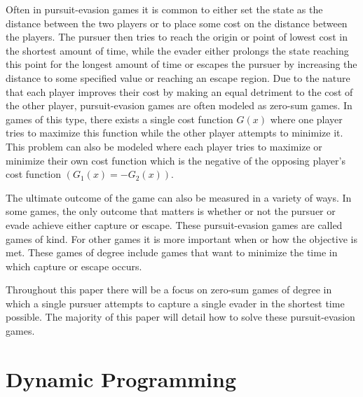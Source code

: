 Often in pursuit-evasion games it is common to either set the state as the distance between the two players or to place some cost on the distance between the players. The pursuer then tries to reach the origin or point of lowest cost in the shortest amount of time, while the evader either prolongs the state reaching this point for the longest amount of time or escapes the pursuer by increasing the distance to some specified value or reaching an escape region. Due to the nature that each player improves their cost by making an equal detriment to the cost of the other player, pursuit-evasion games are often modeled as zero-sum games. In games of this type, there exists a single cost function $G(x)$ where one player tries to maximize this function while the other player attempts to minimize it. This problem can also be modeled where each player tries to maximize or minimize their own cost function which is the negative of the opposing player's cost function $(G_1(x) = -G_2(x))$.

The ultimate outcome of the game can also be measured in a variety of ways. In some games, the only outcome that matters is whether or not the pursuer or evade achieve either capture or escape. These pursuit-evasion games are called games of kind. For other games it is more important when or how the objective is met. These games of degree include games that want to minimize the time in which capture or escape occurs. \cite{isaacs}

Throughout this paper there will be a focus on zero-sum games of degree in which a single pursuer attempts to capture a single evader in the shortest time possible. The majority of this paper will detail how to solve these pursuit-evasion games.

\section{Dynamic Programming}

